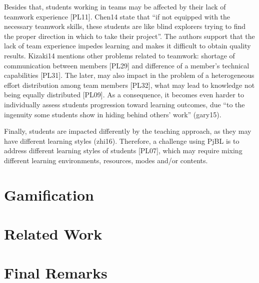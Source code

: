 Besides that, students working in teams may be affected by their lack of teamwork experience [PL11]. Chen14 state that “if not equipped with the necessary teamwork skills, these students are like blind explorers trying to find the proper direction in which to take their project”. The authors support that the lack of team experience impedes learning and makes it difficult to obtain quality results. 
Kizaki14 mentions other problems related to teamwork: shortage of communication between members [PL29] and difference of a member's technical capabilities [PL31]. The later, may also impact in the problem of a heterogeneous effort distribution among team members [PL32], what may lead to knowledge not being equally distributed [PL09]. As a consequence, it becomes even harder to individually assess students progression toward learning outcomes, due “to the ingenuity some students show in hiding behind others’ work” (gary15).

Finally, students are impacted differently by the teaching approach, as they may have different learning styles (zhi16). Therefore, a challenge using PjBL is to address different learning styles of students [PL07], which may require mixing different learning environments, resources, modes and/or contents.



\section{Gamification}

\section{Related Work}

\section{Final Remarks}